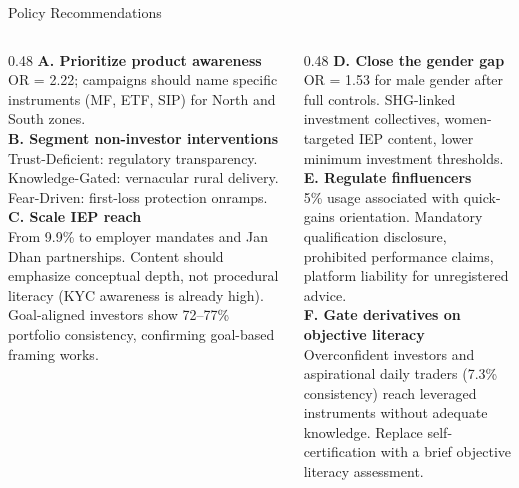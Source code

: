 \documentclass[10pt, aspectratio=169]{beamer}
\begin{document}
\begin{frame}{Policy Recommendations}
  \begin{columns}[T]
    \begin{column}{0.48\textwidth}
      \textbf{A. Prioritize product awareness}\\
      OR = 2.22; campaigns should name specific instruments
      (MF, ETF, SIP) for North and South zones.\\[0.4em]

      \textbf{B. Segment non-investor interventions}\\
      Trust-Deficient: regulatory transparency.
      Knowledge-Gated: vernacular rural delivery.
      Fear-Driven: first-loss protection onramps.\\[0.4em]

      \textbf{C. Scale IEP reach}\\
      From 9.9\% to employer mandates and Jan Dhan partnerships.
      Content should emphasize conceptual depth, not procedural literacy
      (KYC awareness is already high). Goal-aligned investors show
      72--77\% portfolio consistency, confirming goal-based framing works.
    \end{column}
    \begin{column}{0.48\textwidth}
      \textbf{D. Close the gender gap}\\
      OR = 1.53 for male gender after full controls. SHG-linked
      investment collectives, women-targeted IEP content,
      lower minimum investment thresholds.\\[0.4em]

      \textbf{E. Regulate finfluencers}\\
      5\% usage associated with quick-gains orientation.
      Mandatory qualification disclosure, prohibited performance claims,
      platform liability for unregistered advice.\\[0.4em]

      \textbf{F. Gate derivatives on objective literacy}\\
      Overconfident investors and aspirational daily traders (7.3\%
      consistency) reach leveraged instruments without adequate knowledge.
      Replace self-certification with a brief objective literacy assessment.
    \end{column}
  \end{columns}
\end{frame}
\end{document}
